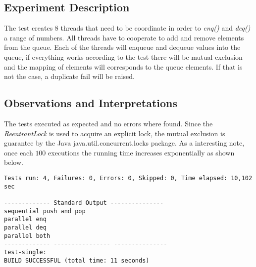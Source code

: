 
\subsection{Experiment Description} 
\par
The test creates $8$ threads that need to be coordinate in order to \textit{enq()} and \textit{deq()} a range of numbers. All threads have to cooperate to add and remove elements from the queue. Each of the threads will enqueue and dequeue values into the queue, if everything works according to the test there will be mutual exclusion and the mapping of elements will corresponds to the queue elements.
If that is not the case, a duplicate fail will be raised.
\par



\subsection{Observations and Interpretations}

\par
The tests executed as expected and no errors where found. Since the \textit{ReentrantLock} is used to acquire an explicit lock, the mutual exclusion is guarantee by the Java java.util.concurrent.locks package.
As a interesting note, once each $100$ executions the running time increases exponentially as shown below.
\begin{lstlisting}[frame=single,breaklines=true]
Tests run: 4, Failures: 0, Errors: 0, Skipped: 0, Time elapsed: 10,102 sec

------------- Standard Output ---------------
sequential push and pop
parallel enq
parallel deq
parallel both
------------- ---------------- ---------------
test-single:
BUILD SUCCESSFUL (total time: 11 seconds)
\end{lstlisting}




